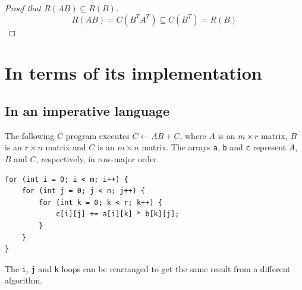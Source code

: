 \documentclass{scrartcl}
\begin{document}
\begin{proof}[Proof that \(R(AB) \subseteq R(B)\)]
  \[R(AB) = C(B^TA^T) \subseteq C(B^T) = R(B)\]
\end{proof}

\section{In terms of its implementation}
\subsection*{In an imperative language}
The following C program executes \(C \gets AB + C\), where \(A\) is an \(m \times r\) matrix, \(B\) is an \(r \times n\) matrix and \(C\) is an \(m \times n\) matrix.
The arrays \texttt{a}, \texttt{b} and \texttt{c} represent \(A\), \(B\) and \(C\), respectively, in row-major order.

\begin{verbatim}
for (int i = 0; i < m; i++) {
    for (int j = 0; j < n; j++) {
        for (int k = 0; k < r; k++) {
            c[i][j] += a[i][k] * b[k][j];
        }
    }
}
\end{verbatim}

The \texttt{i}, \texttt{j} and \texttt{k} loops can be rearranged to get the same result from a different algorithm.
\end{document}
